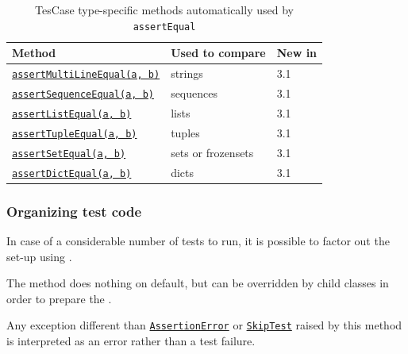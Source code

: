 \newpage
\begin{table}[h!t]
    \begin{tabularx}{\textwidth}{|l|X|X|}
        \hline
        Method & Used to compare & New in\\
        \hline
        \href{https://docs.python.org/3/library/unittest.html\#unittest.TestCase.assertMultiLineEqual}
             {\texttt{assertMultiLineEqual(a, b)}} & strings & 3.1 \\
        \hline
        \href{https://docs.python.org/3/library/unittest.html\#unittest.TestCase.assertSequenceEqual}
             {\texttt{assertSequenceEqual(a, b)}} & sequences & 3.1 \\
        \hline
        \href{https://docs.python.org/3/library/unittest.html\#unittest.TestCase.assertListEqual}
             {\texttt{assertListEqual(a, b)}} & lists & 3.1 \\
        \hline
        \href{https://docs.python.org/3/library/unittest.html\#unittest.TestCase.assertTupleEqual}
             {\texttt{assertTupleEqual(a, b)}} & tuples & 3.1 \\
        \hline
        \href{https://docs.python.org/3/library/unittest.html\#unittest.TestCase.assertSetEqual}
             {\texttt{assertSetEqual(a, b)}} & sets or frozensets & 3.1 \\
        \hline
        \href{https://docs.python.org/3/library/unittest.html\#unittest.TestCase.assertDictEqual}
             {\texttt{assertDictEqual(a, b)}} & dicts & 3.1 \\
        \hline
    \end{tabularx}
    \caption{TesCase type-specific methods automatically used by \texttt{assertEqual}}
    \label{tab:typespecificassertmethods}
\end{table}

\subsubsection{Organizing test code}

In case of a considerable number of tests to run, it is possible to 
factor out the set-up using .

The  method does nothing on default, but 
can be overridden by child classes in order to prepare the .

Any exception different than \href{https://docs.python.org/3/library/exceptions.html\#AssertionError}{\texttt{AssertionError}} 
or \href{https://docs.python.org/3/library/unittest.html\#unittest.SkipTest}{\texttt{SkipTest}} 
raised by this method is interpreted as an error rather than a test failure.

